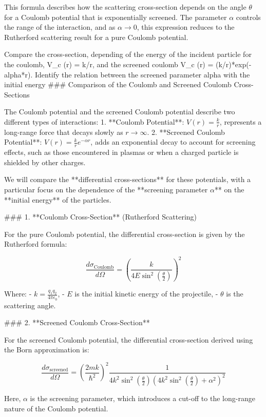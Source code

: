 This formula describes how the scattering cross-section depends on the angle \( \theta \) for a Coulomb potential that is exponentially screened. The parameter \( \alpha \) controls the range of the interaction, and as \( \alpha \to 0 \), this expression reduces to the Rutherford scattering result for a pure Coulomb potential.

Compare the cross-section, depending of the energy of the incident particle for the coulomb, V_c (r) = k/r, and the screened coulomb V_c (r) = (k/r)*exp(-alpha*r). Identify the relation between the screened parameter alpha with the initial energy
### Comparison of the Coulomb and Screened Coulomb Cross-Sections

The Coulomb potential and the screened Coulomb potential describe two different types of interactions:
1. **Coulomb Potential**: \( V(r) = \frac{k}{r} \), represents a long-range force that decays slowly as \( r \to \infty \).
2. **Screened Coulomb Potential**: \( V(r) = \frac{k}{r} e^{-\alpha r} \), adds an exponential decay to account for screening effects, such as those encountered in plasmas or when a charged particle is shielded by other charges.

We will compare the **differential cross-sections** for these potentials, with a particular focus on the dependence of the **screening parameter \( \alpha \)** on the **initial energy** of the particles.

### 1. **Coulomb Cross-Section** (Rutherford Scattering)

For the pure Coulomb potential, the differential cross-section is given by the Rutherford formula:

\[
\frac{d\sigma_{\text{Coulomb}}}{d\Omega} = \left( \frac{k}{4 E \sin^2\left(\frac{\theta}{2}\right)} \right)^2
\]

Where:
- \( k = \frac{q_1 q_2}{4 \pi \epsilon_0} \),
- \( E \) is the initial kinetic energy of the projectile,
- \( \theta \) is the scattering angle.

### 2. **Screened Coulomb Cross-Section**

For the screened Coulomb potential, the differential cross-section derived using the Born approximation is:

\[
\frac{d\sigma_{\text{screened}}}{d\Omega} = \left( \frac{2 m k}{\hbar^2} \right)^2 \frac{1}{4 k^2 \sin^2\left( \frac{\theta}{2} \right) \left( 4 k^2 \sin^2\left( \frac{\theta}{2} \right) + \alpha^2 \right)^2}
\]

Here, \( \alpha \) is the screening parameter, which introduces a cut-off to the long-range nature of the Coulomb potential.

